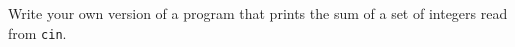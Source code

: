%
%
\begin{question}
Write your own version of a program that prints the sum of
a set of integers read from \verb|cin|.
\end{question}
